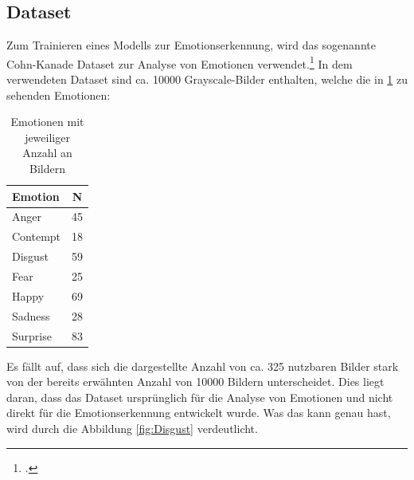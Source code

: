 \documentclass[12pt, a4paper]{scrbook}
\begin{document}
\subsection{Dataset}
Zum Trainieren eines Modells zur Emotionserkennung, wird das sogenannte Cohn-Kanade Dataset zur Analyse von Emotionen verwendet.\footcite[Vgl.][]{CK} In dem verwendeten Dataset sind ca. 10000 Grayscale-Bilder enthalten, welche die in \ref{tab:ckemotions} zu sehenden Emotionen:
\begin{table}[h]
\centering
\begin{tabular}[t]{l|c}
Emotion & N \\
\hline
Anger & 45 \\
Contempt & 18 \\
Disgust & 59 \\
Fear & 25 \\
Happy & 69 \\
Sadness & 28 \\
Surprise & 83 \\
\hline
\end{tabular}
\caption{Emotionen mit jeweiliger Anzahl an Bildern}
\label{tab:ckemotions}
\end{table}
Es fällt auf, dass sich die dargestellte Anzahl von ca. 325 nutzbaren Bilder stark von der bereits erwähnten Anzahl von 10000 Bildern unterscheidet. Dies liegt daran, dass das Dataset ursprünglich für die Analyse von Emotionen und nicht direkt für die Emotionserkennung entwickelt wurde. Was das kann genau hast, wird durch die Abbildung \ref{fig:Disgust} verdeutlicht.
\end{document}
